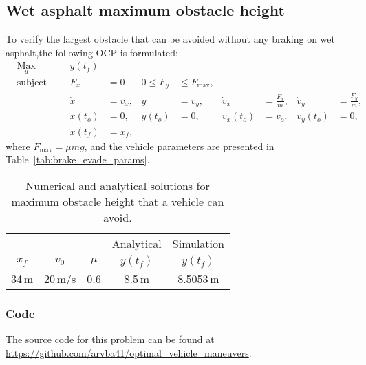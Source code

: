 \subsection{Wet asphalt maximum obstacle height}
To verify the largest obstacle that can be avoided without any braking on wet asphalt,the following OCP is formulated:
\begin{align}
    & \underset{u}{\text{Max}}
    & & & y(t_f)\\
%
    & \text{subject to} 
    & & & F_x &= 0 &0 \leq F_y &\leq F_{\text{max}},\\
%
    &&& & \dot x &= v_x, & \dot y &= v_y, & \dot v_x &= \frac{F_x}{m}, & \dot v_y &= \frac{F_y}{m},\\
%
    &&& & x(t_o) &= 0, & y(t_o) &= 0, & v_x(t_o) &= v_o, & v_y(t_o) &= 0,\\
    &&& & x(t_f) &= x_f,
\end{align}
where $F_{\text{max}} = \mu m g$, and the vehicle parameters are presented in Table~\ref{tab:brake_evade_params}.
\begin{table}[h!]
    \centering
    \begin{tabular}{c|c|c|c|c}
        & & & Analytical & Simulation\\
        $x_f$ & $v_0$ & $\mu$ & $y(t_f)$ & $y(t_f)$ \\
        \hline
        34\,m & 20\,m/s & 0.6 & 8.5\,m & 8.5053\,m \\
    \end{tabular}
    \caption{Numerical and analytical solutions for maximum obstacle height that a vehicle can avoid.}
\end{table}
\subsubsection{Code}
The source code for this problem can be found at \newline \href{https://github.com/arvba41/optimal_vehicle_maneuvers/blob/main/uppgift/ugf3/brake_or_evade_p2a.m}{https://github.com/arvba41/optimal\_vehicle\_maneuvers}.
